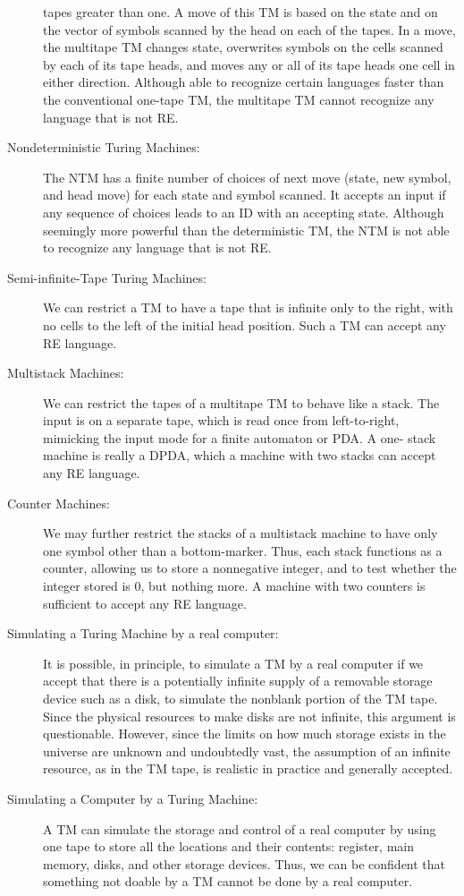 \documentclass[]{article}
\begin{document}
\begin{description}
tapes greater than one. A move of this TM is based on the state and on the
vector of symbols scanned by the head on each of the tapes. In a move, the
multitape TM changes state, overwrites symbols on the cells scanned by each of
its tape heads, and moves any or all of its tape heads one cell in either
direction. Although able to recognize certain languages faster than the
conventional one-tape TM, the multitape TM cannot recognize any language that is
not RE.
\item[Nondeterministic Turing Machines:] The NTM has a finite number of choices
of next move (state, new symbol, and head move) for each state and symbol
scanned. It accepts an input if any sequence of choices leads to an ID with an
accepting state. Although seemingly more powerful than the deterministic TM, the
NTM is not able to recognize any language that is not RE.
\item[Semi-infinite-Tape Turing Machines:] We can restrict a TM to have a tape
that is infinite only to the right, with no cells to the left of the initial
head position. Such a TM can accept any RE language.
\item[Multistack Machines:] We can restrict the tapes of a multitape TM to
behave like a stack. The input is on a separate tape, which is read once from
left-to-right, mimicking the input mode for a finite automaton or PDA. A one-
stack machine is really a DPDA, which a machine with two stacks can accept any
RE language.
\item[Counter Machines:] We may further restrict the stacks of a multistack
machine to have only one symbol other than a bottom-marker. Thus, each stack
functions as a counter, allowing us to store a nonnegative integer, and to test
whether the integer stored is 0, but nothing more. A machine with two counters
is sufficient to accept any RE language.
\item[Simulating a Turing Machine by a real computer:] It is possible, in
principle, to simulate a TM by a real computer if we accept that there is a
potentially infinite supply of a removable storage device such as a disk, to
simulate the nonblank portion of the TM tape. Since the physical resources to
make disks are not infinite, this argument is questionable. However, since the
limits on how much storage exists in the universe are unknown and undoubtedly
vast, the assumption of an infinite resource, as in the TM tape, is realistic in
practice and generally accepted.
\item[Simulating a Computer by a Turing Machine:] A TM can simulate the storage
and control of a real computer by using one tape to store all the locations and
their contents: register, main memory, disks, and other storage devices. Thus,
we can be confident that something not doable by a TM cannot be done by a real
computer.
\end{description}
\end{document}

